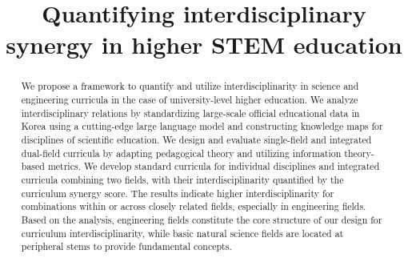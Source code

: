 \documentclass{bmcart}
\begin{document}
\begin{frontmatter}

\begin{fmbox}

\title{Quantifying interdisciplinary synergy in higher STEM education}

%
\author[
   addressref={aff1},
   email={dotchgahyoun@gnu.ac.kr}
]{ }
\author[
   addressref={aff2}, 
   email={jinhyuk.yun@ssu.ac.kr}
]{ }
\author[
   addressref={aff1,aff3,aff4}, 
   corref={aff1}, 
   email={lshlj82@gnu.ac.kr}
]{ }

\address[id=aff1]{%
  , 
  , 
  , 
}
\address[id=aff2]{%
  , 
  , 
  , 
}
\address[id=aff3]{%
  , 
  , 
  , 
}
\address[id=aff4]{%
  , 
  , 
  , 
}

\end{fmbox}

\begin{abstractbox}
\begin{abstract}
We propose a framework to quantify and utilize interdisciplinarity in science and engineering curricula in the case of university-level higher education. We analyze interdisciplinary relations by standardizing large-scale official educational data in Korea using a cutting-edge large language model and constructing knowledge maps for disciplines of scientific education. We design and evaluate single-field and integrated dual-field curricula by adapting pedagogical theory and utilizing information theory-based metrics. We develop standard curricula for individual disciplines and integrated curricula combining two fields, with their interdisciplinarity quantified by the curriculum synergy score. The results indicate higher interdisciplinarity for combinations within or across closely related fields, especially in engineering fields. Based on the analysis, engineering fields constitute the core structure of our design for curriculum interdisciplinarity, while basic natural science fields are located at peripheral stems to provide fundamental concepts.
\end{abstract}
\begin{keyword}
\end{keyword}
\end{abstractbox}
\end{frontmatter}
\end{document}
